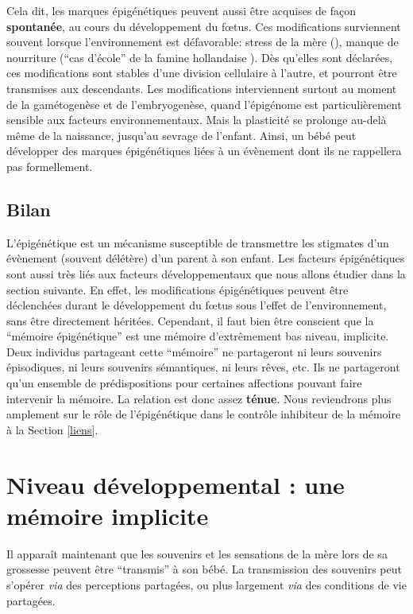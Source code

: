 \documentclass[french]{article}
\begin{document}
				
				Cela dit, les marques épigénétiques peuvent aussi être acquises de façon \textbf{spontanée}, au cours du développement du fœtus. Ces modifications surviennent souvent lorsque l'environnement est défavorable: stress de la mère (\cite{vaiserman2017}), manque de nourriture (``cas d'école'' de la famine hollandaise \cite{heijmans2008}). Dès qu'elles sont déclarées, ces modifications sont stables d'une division cellulaire à l'autre, et pourront être transmises aux descendants. Les modifications interviennent surtout au moment de la gamétogenèse et de l'embryogenèse, quand l'épigénome est particulièrement sensible aux facteurs environnementaux. Mais la plasticité se prolonge au-delà même de la naissance, jusqu'au sevrage de l'enfant. Ainsi, un bébé peut développer des marques épigénétiques liées à un évènement dont ils ne rappellera pas formellement.
	
			\subsection{Bilan}
				L'épigénétique est un mécanisme susceptible de transmettre les stigmates d'un évènement (souvent délétère) d'un parent à son enfant. Les facteurs épigénétiques sont aussi très liés aux facteurs développementaux que nous allons étudier dans la section suivante. En effet, les modifications épigénétiques peuvent être déclenchées durant le développement du fœtus sous l'effet de l'environnement, sans être directement héritées. Cependant, il faut bien être conscient que la ``mémoire épigénétique'' est une mémoire d'extrêmement bas niveau, implicite. Deux individus partageant cette ``mémoire'' ne partageront ni leurs souvenirs épisodiques, ni leurs souvenirs sémantiques, ni leurs rêves, etc. Ils ne partageront qu'un ensemble de prédispositions pour certaines affections pouvant faire intervenir la mémoire. La relation est donc assez \textbf{ténue}. Nous reviendrons plus amplement sur le rôle de l'épigénétique dans le contrôle inhibiteur de la mémoire à la Section \ref{liens}.
				
		\section{Niveau développemental : une mémoire implicite}\label{develo}
			Il apparaît maintenant que les souvenirs et les sensations de la mère lors de sa grossesse peuvent être ``transmis'' à son bébé. La transmission des souvenirs peut s'opérer \textit{via} des perceptions partagées, ou plus largement \textit{via} des conditions de vie partagées.
\end{document}
